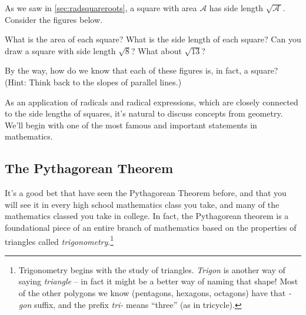 \begin{boxedexplore}
As we saw in \cref{sec:radsquareroots}, a square with area $\mathcal{A}$ has side length $\sqrt{\!\mathcal{A}\,}$. Consider the figures below.

\begin{center}
\end{center}

What is the area of each square? What is the side length of each square? Can you draw a square with side length $\sqrt{8}$? What about $\sqrt{13}$?

By the way, how do we know that each of these figures is, in fact, a square? (Hint: Think back to the slopes of parallel lines.)
\end{boxedexplore}

As an application of radicals and radical expressions, which are closely connected to the side lengths of squares, it's natural to discuss concepts from geometry. We'll begin with one of the most famous and important statements in mathematics.

\subsection{The Pythagorean Theorem}

It's a good bet that have seen the Pythagorean Theorem before, and that you will see it in every high school mathematics class you take, and many of the mathematics classed you take in college. In fact, the Pythagorean theorem is a foundational piece of an entire branch of mathematics based on the properties of triangles called \textit{trigonometry}.\footnote{Trigonometry begins with the study of triangles. \textit{Trigon} is another way of saying \textit{triangle} -- in fact it might be a better way of naming that shape! Most of the other polygons we know (pentagons, hexagons, octagons) have that \textit{-gon} suffix, and the prefix \textit{tri-} means ``three'' (as in tricycle).}

